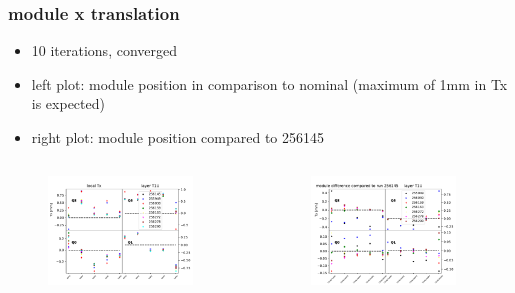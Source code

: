\documentclass[aspectratio=1610, 12pt]{beamer}
\begin{document}
\begin{frame}\frametitle{module x translation}
  \begin{itemize}
    \item 10 iterations, converged
    \item left plot: module position in comparison to nominal (maximum of 1mm in Tx is expected)
    \item right plot: module position compared to 256145
  \end{itemize}
  \begin{columns}
    \begin{column}[c]{0.48\textwidth}
      \begin{figure}
        \includegraphics[width=0.9\textwidth]{plots/relative_pos/tx_all_runs_T1U.pdf}
      \end{figure}
    \end{column}
    \begin{column}[c]{0.48\textwidth}
      \begin{figure}
        \includegraphics[width=0.9\textwidth]{plots/outfiles_comparison/diff_runs_diff_plots_T1U.pdf}
      \end{figure}
    \end{column}
  \end{columns}
\end{frame}
\end{document}
